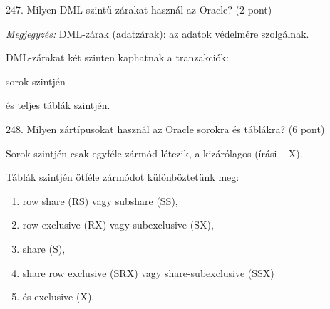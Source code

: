 \documentclass[a4paper,11.5pt, table]{article}
\begin{document}
247. Milyen DML szintű zárakat használ az Oracle? (2 pont)
	\begin{compactitem}
		\item \textit{Megjegyzés:} DML-zárak (adatzárak): az adatok védelmére szolgálnak.
		\item DML-zárakat két szinten kaphatnak a tranzakciók: 
		\begin{compactitem}
			\item sorok szintjén 
			\item és teljes táblák szintjén. 
		\end{compactitem}
	\end{compactitem}

248. Milyen zártípusokat használ az Oracle sorokra és táblákra? (6 pont)
	\begin{compactitem}
		\item Sorok szintjén csak egyféle zármód létezik, a kizárólagos (írási – X). 
		\item Táblák szintjén ötféle zármódot különböztetünk meg: 
		\begin{enumerate}
			\item row share (RS) vagy subshare (SS), 
			\item row exclusive (RX) vagy subexclusive (SX), 
			\item share (S), 
			\item share row exclusive (SRX) vagy share-subexclusive (SSX) 
			\item és exclusive (X).
		\end{enumerate}
	\end{compactitem}
\end{document}
